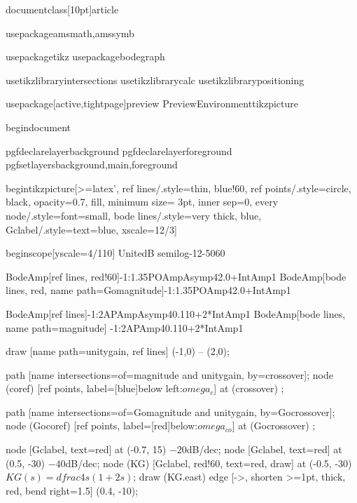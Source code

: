 documentclass[10pt]{article}

usepackage{amsmath,amssymb}

usepackage{tikz}
usepackage{bodegraph}

usetikzlibrary{intersections}
usetikzlibrary{calc}
usetikzlibrary{positioning}

usepackage[active,tightpage]{preview}
PreviewEnvironment{tikzpicture}


begin{document}

pgfdeclarelayer{background}
pgfdeclarelayer{foreground}
pgfsetlayers{background,main,foreground}

begin{tikzpicture}[>=latex',
    ref lines/.style={thin, blue!60},
    ref points/.style={circle, black, opacity=0.7, fill, minimum size= 3pt, inner sep=0},
    every node/.style={font=small},
    bode lines/.style={very thick, blue},
    Gclabel/.style={text=blue},
    xscale=12/3]

begin{scope}[yscale=4/110]
UnitedB
semilog{-1}{2}{-50}{60}

BodeAmp[ref lines, red!60]{-1:1.35}{POAmpAsymp{4}{2.0}+IntAmp{1}}
BodeAmp[bode lines, red, name path=Gomagnitude]{-1:1.35}{POAmp{4}{2.0}+IntAmp{1}}

BodeAmp[ref lines]{-1:2}{APAmpAsymp{4}{0.1}{10}+2*IntAmp{1}}
BodeAmp[bode lines, name path=magnitude]
    {-1:2}{APAmp{4}{0.1}{10}+2*IntAmp{1}}

draw [name path=unitygain, ref lines] (-1,0) -- (2,0);

path [name intersections={of=magnitude and unitygain, by=crossover}];
node (coref) [ref points, label={[blue]below left:$omega_c$}] 
    at (crossover) {};

path [name intersections={of=Gomagnitude and unitygain, by=Gocrossover}];
node (Gocoref) [ref points, label={[red]below:$omega_{co}$}] 
    at (Gocrossover) {};

node [Gclabel, text=red] at (-0.7, 15) {$-20$dB/dec};
node [Gclabel, text=red] at (0.5, -30) {$-40$dB/dec};
node (KG) [Gclabel, red!60, text=red, draw] 
    at (-0.5, -30) {$KG(s)=dfrac{4}{s(1+2s)}$};
draw (KG.east) edge [->, shorten >=1pt, thick, red, bend right=1.5] 
    (0.4, -10);

